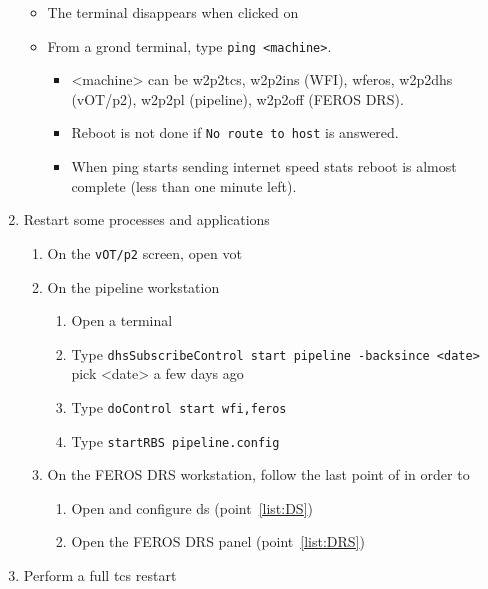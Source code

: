 \documentclass[11pt,fleqn,a4paper]{book}
\begin{document}
\begin{enumerate}
\begin{itemize}
        \item The terminal disappears when clicked on
        \item From a grond terminal, type \texttt{ping <machine>}.
             \begin{itemize}
             \item <machine> can be \gls{w2p2tcs}, \gls{w2p2ins} (WFI), \gls{wferos}, \gls{w2p2dhs} (vOT/p2), \gls{w2p2pl} (pipeline), \gls{w2p2off} (FEROS DRS). 
             \item Reboot is not done if \texttt{No route to host} is answered.
             \item When ping starts sending internet speed stats reboot is almost complete (less than one minute left).
             \end{itemize}
    \end{itemize}
\item Restart some processes and applications
    \begin{enumerate}
        \item On the \texttt{vOT/p2} screen, open \gls{vot}
        \item On the pipeline workstation
             \begin{enumerate}
                \item Open a terminal
                \item Type \texttt{dhsSubscribeControl start pipeline -backsince <date>}\\
            pick <date> a few days ago
                \item Type \texttt{doControl start wfi,feros}
                \item Type \texttt{startRBS pipeline.config}
             \end{enumerate}
        \item On the FEROS DRS workstation, follow the last point of  in order to
             \begin{enumerate}
                \item Open and configure \gls{ds} (point~\ref{list:DS})
                \item Open the FEROS DRS panel (point~\ref{list:DRS})
             \end{enumerate}
    \end{enumerate}
\item \label{list:soft:tcs}Perform a full \gls{tcs} restart
\end{enumerate}
\end{document}
